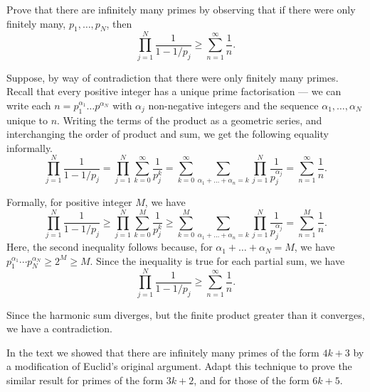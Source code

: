\documentclass[12 pt, letterpaper]{hmcpset}
\begin{document}
\begin{problem}[S \& S \S 8.4 \#1]
	Prove that there are infinitely many primes by observing that if there were only finitely many,  $p_{1}, \dots, p_{N}$, then
	\[
		\prod_{j = 1}^{N} \frac{1}{1 - 1/p_{j}} \ge \sum_{n = 1}^{\infty} \frac{1}{n}.
	\]
\end{problem}

\begin{solution}
	Suppose, by way of contradiction that there were only finitely many primes. Recall that every positive integer has a unique prime factorisation --- we can write each $n = p_{1}^{\alpha_{1}} \dots p^{\alpha_{N}}$ with $\alpha_{j}$ non-negative integers and the sequence $\alpha_{1}, \dots, \alpha_{N}$ unique to $n$. Writing the terms of the product as a geometric series, and interchanging the order of product and sum, we get the following equality informally.
	\[
		\prod_{j = 1}^{N} \frac{1}{1 - 1/p_{j}} = \prod_{j = 1}^{N} \sum_{k = 0}^{\infty} \frac{1}{p_{j}^{k}} = \sum_{k = 0}^{\infty} \sum_{\alpha_{1} + \dots + \alpha_{n} = k} \prod_{j = 1}^{N} \frac{1}{p_{j}^{\alpha_{j}}} = \sum_{n = 1}^{\infty} \frac{1}{n}.
	\]

	Formally, for positive integer $M$, we have
	\[
		\prod_{j = 1}^{N} \frac{1}{1 - 1/p_{j}} \ge \prod_{j = 1}^{N} \sum_{k = 0}^{M} \frac{1}{p_{j}^{k}} \ge \sum_{k = 0}^{M} \sum_{\alpha_{1} + \dots + \alpha_{n} = k} \prod_{j = 1}^{N} \frac{1}{p_{j}^{\alpha_{j}}} = \sum_{n = 1}^{M} \frac{1}{n}.
	\]
	Here, the second inequality follows because, for $\alpha_{1} + \dots + \alpha_{N} = M$, we have $p_{1}^{\alpha_{1}} \cdots p_{N}^{\alpha_{N}} \ge 2^{M} \ge M$. Since the inequality is true for each partial sum, we have
	\[
		\prod_{j = 1}^{N} \frac{1}{1 - 1/p_{j}} \ge \sum_{n = 1}^{\infty} \frac{1}{n}.
	\]

	Since the harmonic sum diverges, but the finite product greater than it converges, we have a contradiction.
\end{solution}

\pagebreak

\begin{problem}[S \& S \S 8.4 \#2]
	In the text we showed that there are infinitely many primes of the form $4k + 3$ by a modification of Euclid's original argument. Adapt this technique to prove the similar result for primes of the form $3k + 2$, and for those of the form $6k + 5$.
\end{problem}
\end{document}
